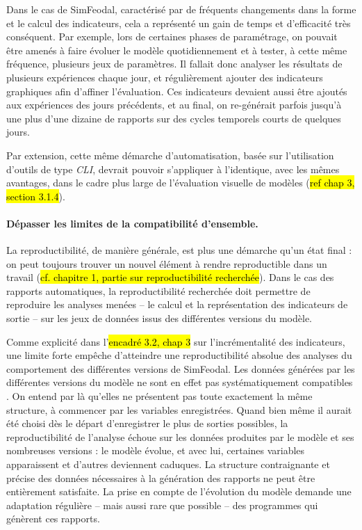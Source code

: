 Dans le cas de SimFeodal, caractérisé par de fréquents changements dans la forme et le calcul des indicateurs, cela a représenté un gain de temps et d'efficacité très conséquent.
Par exemple, lors de certaines phases de paramétrage, on pouvait être amenés à faire évoluer le modèle quotidiennement et à tester, à cette même fréquence, plusieurs jeux de paramètres.
Il fallait donc analyser les résultats de plusieurs expériences chaque jour, et régulièrement ajouter des indicateurs graphiques afin d'affiner l'évaluation.
Ces indicateurs devaient aussi être ajoutés aux expériences des jours précédents, et au final, on re-générait parfois jusqu'à une plus d'une dizaine de rapports sur des cycles temporels courts de quelques jours.

Par extension, cette même démarche d'automatisation, basée sur l'utilisation d'outils de type \textit{CLI}, devrait pouvoir s'appliquer à l'identique, avec les mêmes avantages, dans le cadre plus large de l'évaluation visuelle de modèles (\hl{ref chap 3, section 3.1.4}).

%
%


\paragraph{Dépasser les limites de la compatibilité d'ensemble.}
La reproductibilité, de manière générale, est plus une démarche qu'un état final : on peut toujours trouver un nouvel élément à \og rendre reproductible\fg{} dans un travail (\hl{cf. chapitre 1, partie sur reproductibilité recherchée}).
Dans le cas des rapports automatiques, la reproductibilité recherchée doit permettre de reproduire les analyses menées -- le calcul et la représentation des indicateurs de sortie -- sur les jeux de données issus des différentes versions du modèle.

Comme explicité dans l'\hl{encadré 3.2, chap 3} sur l'incrémentalité des indicateurs, une limite forte empêche d'atteindre une reproductibilité absolue des analyses du comportement des différentes versions de SimFeodal.
Les données générées par les différentes versions du modèle ne sont en effet pas systématiquement \og compatibles \fg{}.
On entend par là qu'elles ne présentent pas toute exactement la même structure, à commencer par les variables enregistrées.
Quand bien même il aurait été choisi dès le départ d'enregistrer le plus de sorties possibles, la reproductibilité de l'analyse échoue sur les données produites par le modèle et ses nombreuses versions : le modèle évolue, et avec lui, certaines variables apparaissent et d'autres deviennent caduques.
La structure contraignante et précise des données nécessaires à la génération des rapports ne peut être entièrement satisfaite.
La prise en compte de l'évolution du modèle demande une adaptation régulière -- mais aussi rare que possible -- des programmes qui génèrent ces rapports.

